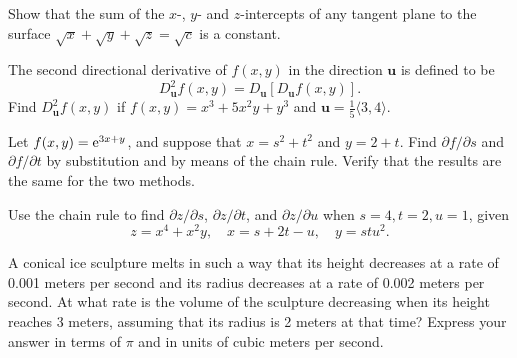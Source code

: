 \documentclass{watsonbook}
\begin{document}
\begin{aexercise}
  Show that the sum of the $x$-, $y$- and $z$-intercepts of any
  tangent plane to the surface
  $\sqrt{x} + \sqrt{y} + \sqrt{z} = \sqrt{c}$ is a constant.
\end{aexercise}

\begin{aexercise}
  The second directional derivative of $f(x,y)$ in the direction
  $\mathbf{u}$ is defined to be
  \[
    D_\mathbf{u}^2 f(x,y) = D_\mathbf{u}[D_{\mathbf{u}} f(x,y)].
  \]
  Find $D_\mathbf{u}^2 f(x,y)$ if $f(x,y) = x^3 + 5x^2y + y^3$ and
  $\mathbf{u} = \frac{1}{5}\langle 3,4\rangle$.
\end{aexercise}




\begin{aexercise}
  Let $f(x,y)=\mathrm{e}^{3x+y}$, and suppose that $x=s^2+t^2$ and
  $y=2+t$. Find $\partial f/\partial s$ and $\partial f/\partial t$ by
  substitution and by means of the chain rule. Verify that the results
  are the same for the two methods.
\end{aexercise}


\begin{aexercise}
  Use the chain rule to find $\partial z/\partial s$, $\partial
  z/\partial t$, and $\partial z/\partial u$ when $s=4, t = 2, u=1$, given 
  \[
    z = x^4 + x^2y, \quad x = s + 2t - u, \quad y = stu^2.
  \]
\end{aexercise}

\begin{aexercise}
  A conical ice sculpture melts in such a way that its height
  decreases at a rate of 0.001 meters per second and its radius
  decreases at a rate of 0.002 meters per second. At what rate is the
  volume of the sculpture decreasing when its height reaches 3 meters,
  assuming that its radius is 2 meters at that time? Express your
  answer in terms of $\pi$ and in units of cubic meters per second.
\end{aexercise}

\end{document}
